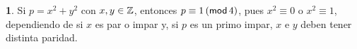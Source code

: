 \theoremstyle{plain}
\newtheorem{teoFermat}{\teoname}%
\newtheorem{lemaFermat}[teoFermat]{\lemaname}

\theoremstyle{definition}
\newtheorem{obsFermat}[teoFermat]{\obsname}
\newtheorem{ejemFermat}[teoFermat]{\ejemname}



\begin{ejemFermat}\label{ejem:fermat}
	Si $p=x^2+y^2$ con $x,y\in\Enteros$, entonces $p\equiv 1\tmodulo[4]$,
	pues $x^2\equiv 0$ o $x^2\equiv 1$, dependiendo de si $x$ es par o
	impar y, si $p$ es un primo impar, $x$ e $y$ deben tener distinta
	paridad.
\end{ejemFermat}

